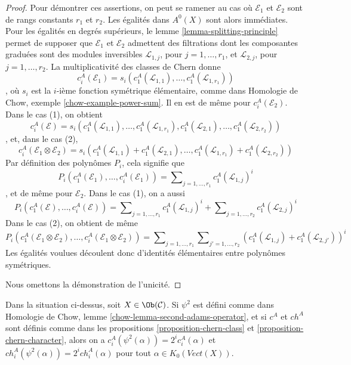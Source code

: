 \begin{proof}
\medskip\noindent
Pour démontrer ces assertions, on peut se ramener au cas où $\mathcal{E}_1$
et $\mathcal{E}_2$ sont de rangs constants $r_1$ et $r_2$. Les
égalités dans $A^0(X)$ sont alors immédiates. Pour les égalités en degrés
supérieurs, le lemme \ref{lemma-splitting-principle} permet de
supposer que $\mathcal{E}_1$ et $\mathcal{E}_2$ admettent des filtrations
dont les composantes graduées sont des modules inversibles
$\mathcal{L}_{1, j}$, pour $j = 1, \ldots, r_1$, et
$\mathcal{L}_{2, j}$, pour $j = 1, \ldots, r_2$.
La multiplicativité des classes de Chern donne
$$
c_i^A(\mathcal{E}_1) =
s_i(c_1^A(\mathcal{L}_{1, 1}), \ldots, c_1^A(\mathcal{L}_{1, r_1}))
$$,
où $s_i$ est la $i$-ième fonction symétrique élémentaire, comme dans
Homologie de Chow, exemple \ref{chow-example-power-sum}.
Il en est de même pour $c_i^A(\mathcal{E}_2)$. Dans le cas (1), on obtient
$$
c_i^A(\mathcal{E}) =
s_i(c_1^A(\mathcal{L}_{1, 1}), \ldots, c_1^A(\mathcal{L}_{1, r_1}),
c_1^A(\mathcal{L}_{2, 1}), \ldots, c_1^A(\mathcal{L}_{2, r_2}))
$$,
et, dans le cas (2),
$$
c_i^A(\mathcal{E}_1 \otimes \mathcal{E}_2) =
s_i(c_1^A(\mathcal{L}_{1, 1}) + c_1^A(\mathcal{L}_{2, 1}),
\ldots, c_1^A(\mathcal{L}_{1, r_1}) + c_1^A(\mathcal{L}_{2, r_2}))
$$
Par définition des polynômes $P_i$, cela signifie que
$$
P_i(c^A_1(\mathcal{E}_1), \ldots, c^A_i(\mathcal{E}_1)) =
\sum\nolimits_{j = 1, \ldots, r_1} c_1^A(\mathcal{L}_{1, j})^i
$$,
et de même pour $\mathcal{E}_2$. Dans le cas (1), on a aussi
$$
P_i(c^A_1(\mathcal{E}), \ldots, c^A_i(\mathcal{E})) =
\sum\nolimits_{j = 1, \ldots, r_1} c_1^A(\mathcal{L}_{1, j})^i +
\sum\nolimits_{j = 1, \ldots, r_2} c_1^A(\mathcal{L}_{2, j})^i
$$
Dans le cas (2), on obtient de même
$$
P_i(c^A_1(\mathcal{E}_1 \otimes \mathcal{E}_2), \ldots,
c^A_i(\mathcal{E}_1 \otimes \mathcal{E}_2)) =
\sum\nolimits_{j = 1, \ldots, r_1}
\sum\nolimits_{j' = 1, \ldots, r_2}
(c_1^A(\mathcal{L}_{1, j}) + c_1^A(\mathcal{L}_{2, j'}))^i
$$
Les égalités voulues découlent donc d'identités élémentaires
entre polynômes symétriques.

\medskip\noindent
Nous omettons la démonstration de l'unicité.
\end{proof}

\begin{lemma}
\label{lemma-adams-and-chern}
Dans la situation ci-dessus, soit $X \in \Ob(\mathcal{C})$.
Si $\psi^2$ est défini comme dans
Homologie de Chow, lemme \ref{chow-lemma-second-adams-operator},
et si $c^A$ et $ch^A$ sont définis comme dans les
propositions \ref{proposition-chern-class} et
\ref{proposition-chern-character},
alors on a $c^A_i(\psi^2(\alpha)) = 2^i c^A_i(\alpha)$ et
$ch^A_i(\psi^2(\alpha)) = 2^i ch^A_i(\alpha)$
pour tout $\alpha \in K_0(\textit{Vect}(X))$.
\end{lemma}

